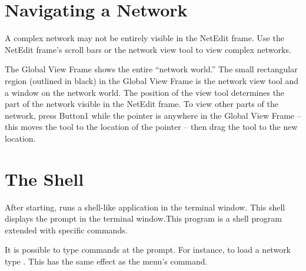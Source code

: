 \section{Navigating a Network}
\label{sec:navnetwork}

A complex network may not be entirely visible in the NetEdit frame.
Use the NetEdit frame's scroll bars or the network view tool to view
complex networks.

The Global View Frame shows the entire ``network world.''  The small
rectangular region (outlined in black) in the Global View Frame is the
network view tool and a window on the network world. The position of
the view tool determines the part of the network visible in the
NetEdit frame.  To view other parts of the network, press Button1 while
the pointer is anywhere in the Global View Frame -- this moves the
tool to the location of the pointer -- then drag the tool to the new
location.


\section{The \sr{} Shell}
\label{sec:termapp}

After starting, \sr{} runs a shell-like application in the terminal
window. This shell displays the prompt
 in the terminal window.This program is a
 shell program extended with
\sr{} specific commands.

It is possible to type \tcl{} \sr{} commands at the prompt.  For
instance, to load a network type .  This has the same effect as the 
menu's  command.
